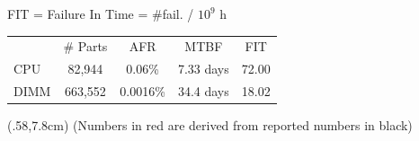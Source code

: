 {\begin{textblock*}{.45\linewidth}
    FIT = Failure In Time = \#fail. / $10^9$ h

    \bigskip

    \begin{tabular}{lcccc}
              & \# Parts & AFR & \textcolor{red!40}{MTBF} & FIT \\
      CPU & 82,944 & 0.06\% & \textcolor{red!40}{7.33 days} & 72.00 \\
      DIMM & 663,552 & 0.0016\% & \textcolor{red!40}{34.4 days} & 18.02 \\
      \end{tabular}
  \end{textblock*}

  \begin{textblock*}{.6\textwidth}(.58\textwidth,7.8cm)
    \scriptsize \textcolor{red!40}{(Numbers in red are derived from reported numbers in black)}
  \end{textblock*}

}

